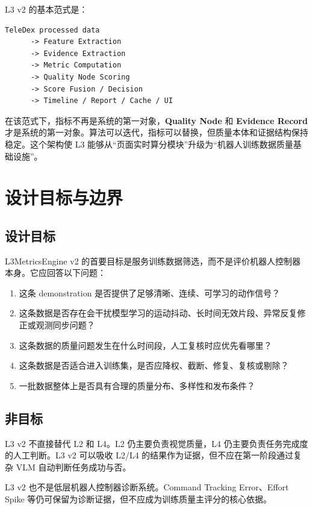 \documentclass[UTF8,zihao=-4]{ctexart}
\newcommand{\Term}[1]{\textbf{#1}}
\begin{document}
L3 v2 的基本范式是：

\begin{verbatim}
TeleDex processed data
      -> Feature Extraction
      -> Evidence Extraction
      -> Metric Computation
      -> Quality Node Scoring
      -> Score Fusion / Decision
      -> Timeline / Report / Cache / UI
\end{verbatim}

在该范式下，指标不再是系统的第一对象，\Term{Quality Node} 和 \Term{Evidence Record} 才是系统的第一对象。算法可以迭代，指标可以替换，但质量本体和证据结构保持稳定。这个架构使 L3 能够从“页面实时算分模块”升级为“机器人训练数据质量基础设施”。

\section{设计目标与边界}

\subsection{设计目标}

L3MetricsEngine v2 的首要目标是服务训练数据筛选，而不是评价机器人控制器本身。它应回答以下问题：

\begin{enumerate}
\item 这条 demonstration 是否提供了足够清晰、连续、可学习的动作信号？
\item 这条数据是否存在会干扰模型学习的运动抖动、长时间无效片段、异常反复修正或观测同步问题？
\item 这条数据的质量问题发生在什么时间段，人工复核时应优先看哪里？
\item 这条数据是否适合进入训练集，是否应降权、截断、修复、复核或剔除？
\item 一批数据整体上是否具有合理的质量分布、多样性和发布条件？
\end{enumerate}

\subsection{非目标}

L3 v2 不直接替代 L2 和 L4。L2 仍主要负责视觉质量，L4 仍主要负责任务完成度的人工判断。L3 v2 可以吸收 L2/L4 的结果作为证据，但不应在第一阶段通过复杂 VLM 自动判断任务成功与否。

L3 v2 也不是低层机器人控制器诊断系统。Command Tracking Error、Effort Spike 等仍可保留为诊断证据，但不应成为训练质量主评分的核心依据。
\end{document}

